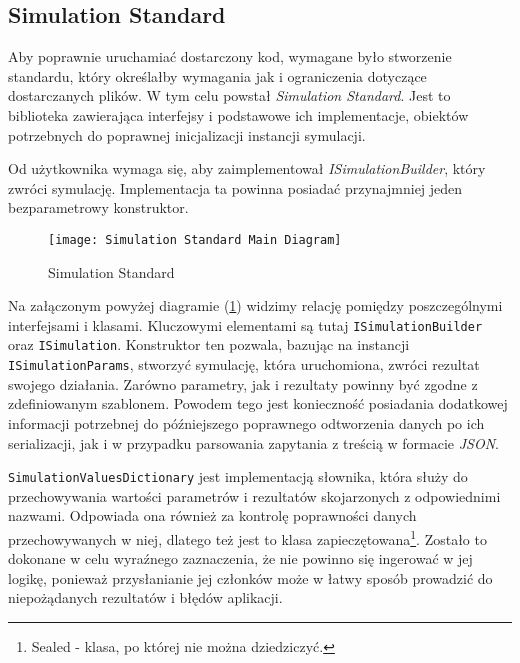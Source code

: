 \subsection{Simulation Standard}
\label{sec:simulationStandard}

\par Aby poprawnie uruchamiać dostarczony kod, wymagane było stworzenie standardu, który określałby wymagania jak i ograniczenia dotyczące dostarczanych plików. W tym celu powstał \emph{Simulation Standard}. Jest to biblioteka zawierająca interfejsy i podstawowe ich implementacje, obiektów potrzebnych do poprawnej inicjalizacji instancji symulacji.

\par Od użytkownika wymaga się, aby zaimplementował \emph{ISimulationBuilder}, który zwróci symulację. Implementacja ta powinna posiadać przynajmniej jeden bezparametrowy konstruktor.

\begin{figure}[H]
	\texttt{[image: Simulation Standard Main Diagram]}
	\caption{Simulation Standard}
	\label{fig:simulationStandard}
\end{figure}

\par Na załączonym powyżej diagramie (\ref{fig:simulationStandard}) widzimy relację pomiędzy poszczególnymi interfejsami i klasami. Kluczowymi elementami są tutaj \texttt{ISimulationBuilder} oraz \texttt{ISimulation}. Konstruktor ten pozwala, bazując na instancji \texttt{ISimulationParams}, stworzyć symulację, która uruchomiona, zwróci rezultat swojego działania. Zarówno parametry, jak i rezultaty powinny być zgodne z zdefiniowanym szablonem. Powodem tego jest konieczność posiadania dodatkowej informacji potrzebnej do późniejszego poprawnego odtworzenia danych po ich serializacji, jak i w przypadku parsowania zapytania z treścią w formacie \emph{JSON}.

\par \texttt{SimulationValuesDictionary} jest implementacją słownika, która służy do przechowywania wartości parametrów i rezultatów skojarzonych z odpowiednimi nazwami. Odpowiada ona również za kontrolę poprawności danych przechowywanych w niej, dlatego też jest to klasa zapieczętowana\footnote{Sealed - klasa, po której nie można dziedziczyć.}. Zostało to dokonane w celu wyraźnego zaznaczenia, że nie powinno się ingerować w jej logikę, ponieważ przysłanianie jej członków może w łatwy sposób prowadzić do niepożądanych rezultatów i błędów aplikacji.

